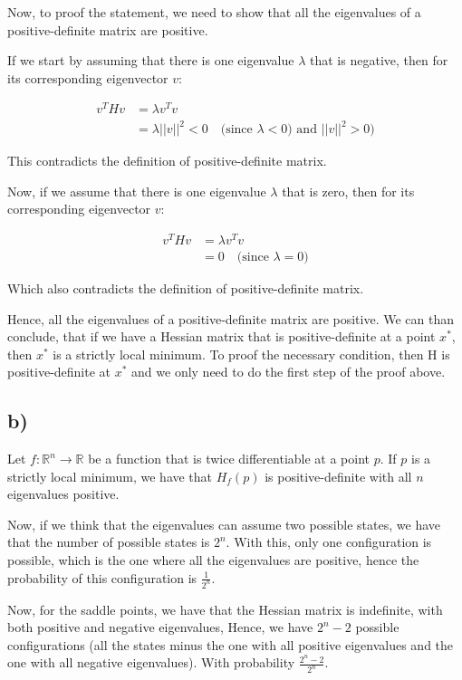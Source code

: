 \documentclass{article}
\begin{document}
Now, to proof the statement, we need to show that all the eigenvalues of a positive-definite matrix are positive.

If we start by assuming that there is one eigenvalue $\lambda$ that is negative, then for its corresponding eigenvector $v$:

\begin{align*}
    v^T H v &= \lambda v^T v \\
    &= \lambda ||v||^2 < 0 \quad \text{(since $\lambda < 0$) and $||v||^2 > 0$)}
\end{align*}

This contradicts the definition of positive-definite matrix.

Now, if we assume that there is one eigenvalue $\lambda$ that is zero, then for its corresponding eigenvector $v$:

\begin{align*}
    v^T H v &= \lambda v^T v \\
    &= 0 \quad \text{(since $\lambda = 0$)}
\end{align*}

Which also contradicts the definition of positive-definite matrix.

Hence, all the eigenvalues of a positive-definite matrix are positive. We can than conclude, that
if we have a Hessian matrix that is positive-definite at a point $x^*$, then $x^*$ is a strictly local minimum.
To proof the necessary condition, then H is positive-definite at $x^*$ and we only need to do the first step of the proof
above. 

\subsection*{b)}

Let $f: \mathbb{R}^n \rightarrow \mathbb{R}$ be a function that is twice differentiable at a point $p$. If $p$
is a strictly local minimum, we have that $H_f(p)$ is positive-definite with all $n$ eigenvalues positive.

Now, if we think that the eigenvalues can assume two possible states, we have that the number of possible states is $2^n$.
With this, only one configuration is possible, which is the one where all the eigenvalues are positive, hence
the probability of this configuration is $\frac{1}{2^n}$.

Now, for the saddle points, we have that the Hessian matrix is indefinite, with both positive and negative eigenvalues, Hence,
we have $2^n - 2$ possible configurations (all the states minus the one with all positive eigenvalues and the one with all negative eigenvalues). With
probability $\frac{2^n - 2}{2^n}$. 
\end{document}
